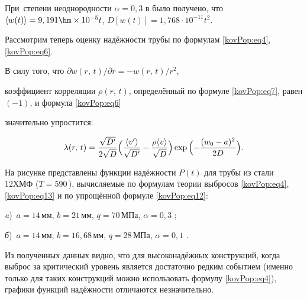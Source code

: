 При~степени неоднородности $\alpha=0,3$ в \cite{KovalPopov:Isutkina} было получено, что $\langle w(t)\rangle=9,191\hm \times 10^{-5}t$, $D[w(t)]=1,768\cdot10^{-11}t^2$.



Рассмотрим теперь оценку надёжности трубы по формулам \eqref{kovPop:eq4}, \eqref{kovPop:eq6}. 

В силу того, что ${\partial w(r,\,t)}/{\partial r}={-w(r,\,t)}/{r^2}$,

коэффициент корреляции $\rho(r,\,t)$, определённый по формуле \eqref{kovPop:eq7}, равен $(-1)$, и формула \eqref{kovPop:eq6}

значительно упростится:

\begin{equation}

\label{kovPop:eq13}

\lambda(r,\,t)=\frac{\sqrt{D'}}{2\sqrt{D}} \Bigl(\frac{\langle

v'\rangle}{\sqrt{D'}}-\frac{\rho\langle

v\rangle}{\sqrt{D}}\Bigr) \exp{\Bigl(-\frac{(w_0-a)^2}{2D}\Bigr)} .

\end{equation}







На рисунке представлены функции надёжности $P(t)$ для трубы  из стали 12ХМФ ($T=590$\,\textcelsius), вычисляемые по формулам теории выбросов \eqref{kovPop:eq4}, \eqref{kovPop:eq13} и по упрощённой формуле \eqref{kovPop:eq12}:

{\sl a})~$a=14\,\text{мм}$, $b=21\,\text{мм}$, $q=70\,\text{МПа}$, $\alpha=0,3$ \cite{KovalPopov:Isutkina};

{\sl б})~$a=14\,\text{мм}$, $b=16,68\,\text{мм}$, $q=28\,\text{МПа}$, $\alpha=0,1$ \cite{KovalPopov:Radchenko}. 

Из полученных данных видно, что для высоконадёжных конструкций, когда выброс за критический уровень является достаточно редким событием (именно только для таких конструкций можно использовать формулу \eqref{kovPop:eq4}), графики функций надёжности отличаются незначительно.





